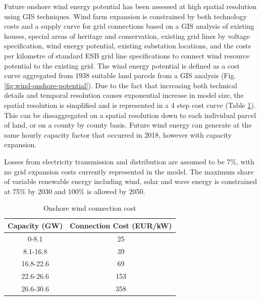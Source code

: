 \documentclass[gmd,manuscript]{copernicus}
\begin{document}
Future onshore wind energy potential has been assessed at high spatial resolution using GIS techniques. Wind farm expansion is constrained by both technology costs and a supply curve for grid connections based on a GIS analysis of existing houses, special areas of heritage and conservation, existing grid lines by voltage specification, wind energy potential, existing substation locations, and the costs per kilometre of standard ESB grid line specifications to connect wind resource potential to the existing grid. The wind energy potential is defined as a cost curve aggregated from 1938 suitable land parcels from a GIS analysis (Fig. \ref{fig:wind-onshore-potential}). Due to the fact that increasing both technical details and temporal resolution causes exponential increase in model size, the spatial resolution is simplified and is represented in a 4 step cost curve (Table \ref{onshore-wind-connection-cost}). This can be dissaggregated on a spatial resolution down to each individual parcel of land, or on a county by county basis. Future wind energy can generate at the same hourly capacity factor that occurred in 2018, however with capacity expansion.

Losses from electricity transmission and distribution are assumed to be 7\%, with no grid expansion costs currently represented in the model. The maximum share of variable renewable energy including wind, solar and wave energy is constrained at 75\% by 2030 and 100\% is allowed by 2050. 

\begin{table}[ht]
 \centering
 \footnotesize
 \caption{Onshore wind connection cost }
 \begin{tabular}{cc}
 \hline 
 Capacity (GW) & Connection Cost (EUR/kW)\\ 
 \hline
 0-8.1 & 25 \\
 
 8.1-16.8 & 39 \\
 
 16.8-22.6 & 69 \\
 
 22.6-26.6 & 153 \\
 
 26.6-30.6 & 358 \\
 
 \hline
 \end{tabular}
 
 \label{onshore-wind-connection-cost}
\end{table}
\end{document}
